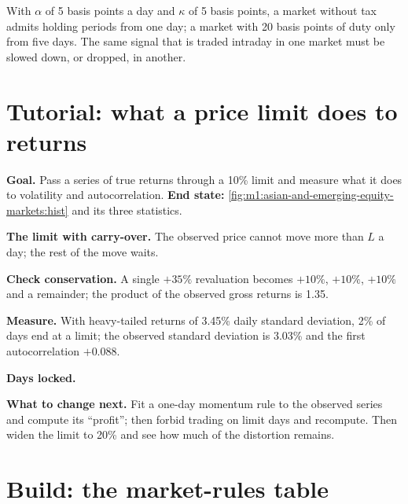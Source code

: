 With $\alpha$ of 5 basis points a day and $\kappa$ of 5 basis points, a
market without tax admits holding periods from one day; a market with 20
basis points of duty only from five days. The same signal that is traded
intraday in one market must be slowed down, or dropped, in another.

\section{Tutorial: what a price limit does to returns}\label{tut:m1:asian-and-emerging-equity-markets:limits}

\begin{tutorial}
\textbf{Goal.} Pass a series of true returns through a 10\% limit and measure
what it does to volatility and autocorrelation. \textbf{End state:}
\cref{fig:m1:asian-and-emerging-equity-markets:hist} and its three
statistics.
\begin{tutsteps}
\item \textbf{The limit with carry-over.} The observed price cannot move more
than $L$ a day; the rest of the move waits.
\label{lst:m1:asian-and-emerging-equity-markets:truncate}
\item \textbf{Check conservation.} A single $+35\%$ revaluation becomes
$+10\%$, $+10\%$, $+10\%$ and a remainder; the product of the observed gross
returns is 1.35.
\item \textbf{Measure.} With heavy-tailed returns of 3.45\% daily standard
deviation, 2\% of days end at a limit; the observed standard deviation is
3.03\% and the first autocorrelation $+0.088$.
\item \textbf{Days locked.}
\label{lst:m1:asian-and-emerging-equity-markets:locked}
\end{tutsteps}
\textbf{What to change next.} Fit a one-day momentum rule to the observed
series and compute its ``profit''; then forbid trading on limit days and
recompute. Then widen the limit to 20\% and see how much of the distortion
remains.
\end{tutorial}

\section{Build: the market-rules table}\label{bld:m1:asian-and-emerging-equity-markets:rules}

